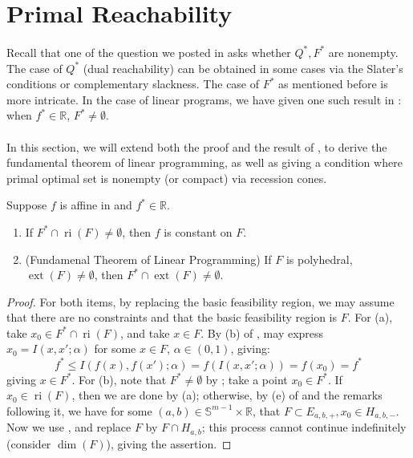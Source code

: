 \section{Primal Reachability}
\label{sect:045}

\paragraph{}Recall that one of the question we posted in  asks whether $Q^\ast,F^\ast$ are nonempty. The case of $Q^\ast$ (dual reachability) can be obtained in some cases via the Slater's conditions or complementary slackness. The case of $F^\ast$ as mentioned before is more intricate. In the case of linear programs, we have given one such result in : when $f^\ast\in \mathbb{R}$, $F^\ast\neq\emptyset$.

\paragraph{}In this section, we will extend both the proof and the result of , to derive the fundamental theorem of linear programming, as well as giving a condition where primal optimal set is nonempty (or compact) via recession cones.

\begin{prop}\label{prop:045-linear-primal-optimality}
	Suppose $f$ is affine in  and $f^\ast\in \mathbb{R}$.
	\begin{enumerate}[label=(\alph*)]
		\item If $F^\ast \cap \operatorname{ri}(F)\neq\emptyset$, then $f$ is constant on $F$.
		\item (Fundamenal Theorem of Linear Programming) If $F$ is polyhedral, $\operatorname{ext}(F)\neq\emptyset$, then $F^\ast\cap\operatorname{ext}(F)\neq\emptyset$.
	\end{enumerate}
\end{prop}

\begin{proof}
	For both items, by replacing the basic feasibility region, we may assume that there are no constraints and that the basic feasibility region is $F$. For (a), take $x_0\in F^\ast \cap \operatorname{ri}(F)$, and take $x\in F$. By (b) of , may express $x_0=I(x,x'; \alpha )$ for some $x\in F$, $\alpha \in (0,1)$, giving:
	\[
		f^\ast \leq I(f(x),f(x');\alpha )=f(I(x,x';\alpha ))=f(x_0)=f^\ast
	\]
	giving $x\in F^\ast$. For (b), note that $F^\ast\neq\emptyset$ by ; take a point $x_0\in F^\ast$. If $x_0\in \operatorname{ri}(F)$, then we are done by (a); otherwise, by (e) of  and the remarks following it, we have for some $(a,b)\in \mathbb{S}^{m-1}\times \mathbb{R}$, that $F\subset E_{a,b,+},x_0\in H_{a,b,-}$. Now we use , and replace $F$ by $F\cap H_{a,b}$; this process cannot continue indefinitely (consider $\dim(F)$), giving the assertion.
\end{proof}

